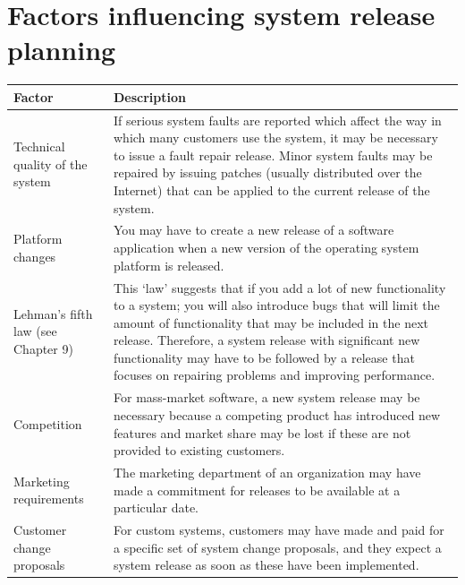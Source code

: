 \section{Factors influencing system release planning}
\begin{table}[h!]
\centering
\begin{tabular}{ |p{3cm}|p{8cm}|  }
\hline
Factor & Description \\
\hline
\hline
Technical quality of the system & If serious system faults are reported which affect the way in which many customers use the system, it may be necessary to issue a fault repair release. Minor system faults may be repaired by issuing patches (usually distributed over the Internet) that can be applied to the current release of the system.\\
\hline
Platform changes & You may have to create a new release of a software application when a new version of the operating system platform is released.\\
\hline
Lehman’s fifth law (see Chapter 9) & This ‘law’ suggests that if you add a lot of new functionality to a system; you will also introduce bugs that will limit the amount of functionality that may be included in the next release. Therefore, a system release with significant new functionality may have to be followed by a release that focuses on repairing problems and improving performance.\\
\hline
Competition & For mass-market software, a new system release may be necessary because a competing product has introduced new features and market share may be lost if these are not provided to existing customers.\\
\hline
Marketing requirements & The marketing department of an organization may have made a commitment for releases to be available at a particular date.\\
\hline
Customer change proposals & For custom systems, customers may have made and paid for a specific set of system change proposals, and they expect a system release as soon as these have been implemented.\\
\hline
\end{tabular}

\label{table:T6_2}
\end{table}

